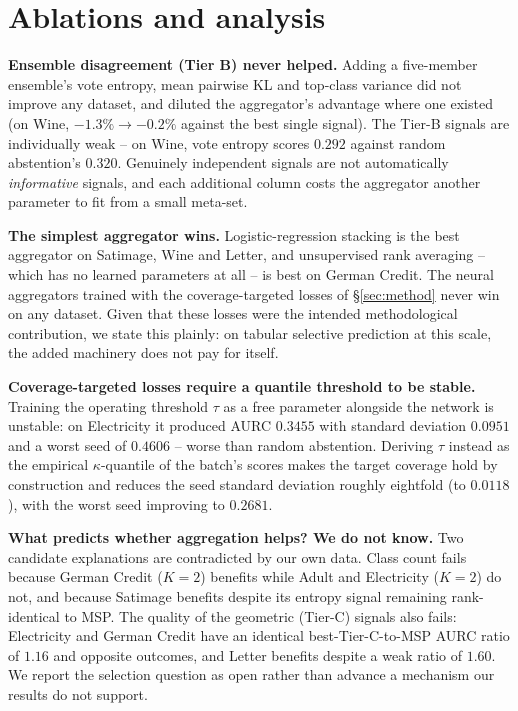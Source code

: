 \documentclass[conference]{IEEEtran}
\begin{document}


\section{Ablations and analysis}
\label{sec:ablations}

\textbf{Ensemble disagreement (Tier B) never helped.} Adding a five-member
ensemble's vote entropy, mean pairwise KL and top-class variance did not
improve any dataset, and diluted the aggregator's advantage where one
existed (on Wine, $-1.3\% \to -0.2\%$ against the best single signal). The
Tier-B signals are individually weak -- on Wine, vote entropy scores
$0.292$ against random abstention's $0.320$. Genuinely independent signals
are not automatically \emph{informative} signals, and each additional
column costs the aggregator another parameter to fit from a small
meta-set.

\textbf{The simplest aggregator wins.} Logistic-regression stacking is the
best aggregator on Satimage, Wine and Letter, and unsupervised rank
averaging -- which has no learned parameters at all -- is best on German
Credit. The neural aggregators trained with the coverage-targeted losses
of \S\ref{sec:method} never win on any dataset. Given that these losses
were the intended methodological contribution, we state this plainly: on
tabular selective prediction at this scale, the added machinery does not
pay for itself.

\textbf{Coverage-targeted losses require a quantile threshold to be
stable.} Training the operating threshold $\tau$ as a free parameter
alongside the network is unstable: on Electricity it produced AURC
$0.3455$ with standard deviation $0.0951$ and a worst seed of $0.4606$ --
worse than random abstention. Deriving $\tau$ instead as the empirical
$\kappa$-quantile of the batch's scores makes the target coverage hold by
construction and reduces the seed standard deviation roughly eightfold
(to $0.0118$), with the worst seed improving to $0.2681$.

\textbf{What predicts whether aggregation helps? We do not know.} Two
candidate explanations are contradicted by our own data. Class count fails
because German Credit ($K{=}2$) benefits while Adult and Electricity
($K{=}2$) do not, and because Satimage benefits despite its entropy signal
remaining rank-identical to MSP. The quality of the geometric (Tier-C)
signals also fails: Electricity and German Credit have an identical
best-Tier-C-to-MSP AURC ratio of $1.16$ and opposite outcomes, and Letter
benefits despite a weak ratio of $1.60$. We report the selection question
as open rather than advance a mechanism our results do not support.
\end{document}
